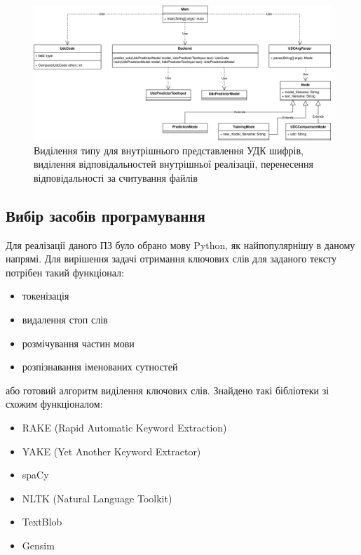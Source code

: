 \documentclass[14pt]{extarticle}
\begin{document}
  \begin{figure}
    \centering
    \includegraphics[height=0.45\textwidth]{io_uml6.drawio.png}    
    \caption{Виділення типу для внутрішнього представлення УДК шифрів,
    виділення відповідальностей внутрішньої реалізації,
    перенесення відповідальності за считування файлів}
    \label{fig:io_uml6}
  \end{figure}

  \newpage

  \subsection{Вибір засобів програмування}
  Для реалізації даного ПЗ було обрано мову Python,
  як найпопулярнішу в даному напрямі.
  Для вирішення задачі отримання ключових слів для заданого тексту
  потрібен такий функціонал:
  \begin{itemize}[labelindent=\dimexpr{}\relax, leftmargin=*]
    \item токенізація
    \item видалення стоп слів \cite{wiki_stop_word}
    \item розмічування частин мови \cite{wiki_pos_tagging}
    \item розпізнавання іменованих сутностей \cite{wiki_ner}
  \end{itemize}
  або готовий алгоритм виділення ключових слів.
  Знайдено такі бібліотеки зі схожим функціоналом:
  \begin{itemize}[labelindent=\dimexpr{}\relax, leftmargin=*]
    \item RAKE (Rapid Automatic Keyword Extraction) \cite{rake_nltk}
    \item YAKE (Yet Another Keyword Extractor) \cite{pypi_yake}
    \item spaCy \cite{spaCy}
    \item NLTK (Natural Language Toolkit) \cite{nltk}
    \item TextBlob \cite{TextBlob}
    \item Gensim \cite{gensim}
  \end{itemize}
\end{document}
